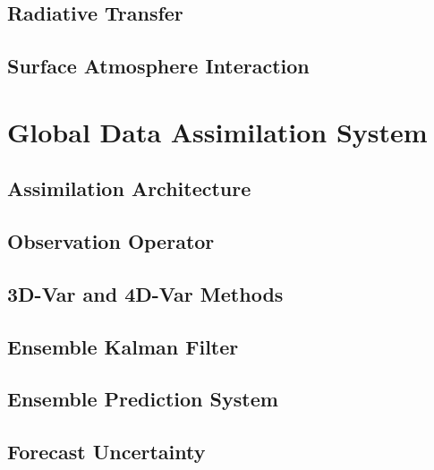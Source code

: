 \documentclass[11pt,a4paper,oneside]{report}
\begin{document}
\chapter{Radiative Transfer}



\chapter{Surface Atmosphere Interaction}



\part{Global Data Assimilation System}


\chapter{Assimilation Architecture}



\chapter{Observation Operator}



\chapter{3D-Var and 4D-Var Methods}



\chapter{Ensemble Kalman Filter}



\chapter{Ensemble Prediction System}



\chapter{Forecast Uncertainty}

\end{document}
